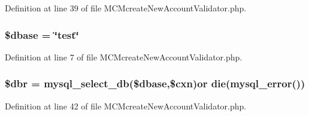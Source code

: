 Definition at line 39 of file M\-C\-Mcreate\-New\-Account\-Validator.\-php.

\hypertarget{_m_c_mcreate_new_account_validator_8php_abd981912075cb8356ca370b4fefdfed7}{
\subsubsection[{\$dbase}]{\setlength{\rightskip}{0pt plus 5cm}\$dbase = \char`\"{}test\char`\"{}}}\label{_m_c_mcreate_new_account_validator_8php_abd981912075cb8356ca370b4fefdfed7}


Definition at line 7 of file M\-C\-Mcreate\-New\-Account\-Validator.\-php.

\hypertarget{_m_c_mcreate_new_account_validator_8php_a88fea670240e5fa6ae306a286acaa0fd}{
\subsubsection[{\$dbr}]{\setlength{\rightskip}{0pt plus 5cm}\$dbr = mysql\-\_\-select\-\_\-db(\$dbase,\$cxn)or die(mysql\-\_\-error())}}\label{_m_c_mcreate_new_account_validator_8php_a88fea670240e5fa6ae306a286acaa0fd}


Definition at line 42 of file M\-C\-Mcreate\-New\-Account\-Validator.\-php.

